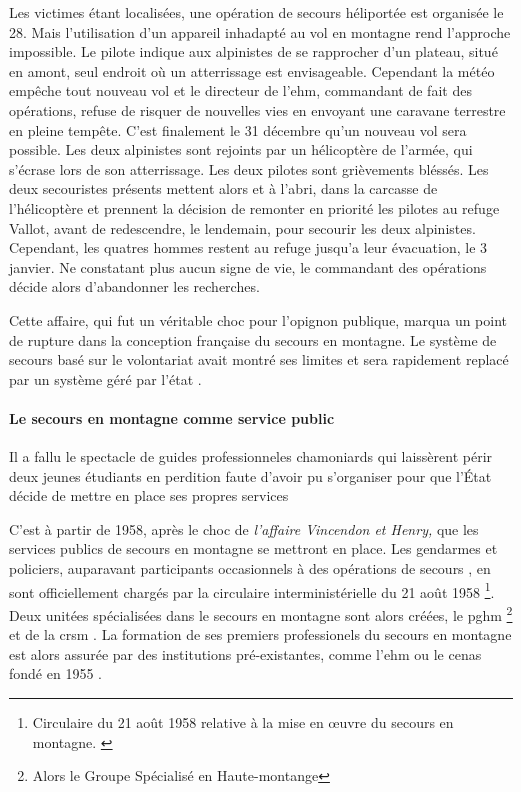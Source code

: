 Les victimes étant localisées, une opération de secours héliportée est
organisée le 28. Mais l'utilisation d'un appareil inhadapté au vol en
montagne rend l'approche impossible. Le pilote indique aux alpinistes
de se rapprocher d'un plateau, situé en amont, seul endroit où un
atterrissage est envisageable. Cependant la météo empêche tout nouveau
vol et le directeur de l'\ac{ehm}, commandant de fait des opérations,
refuse de risquer de nouvelles vies en envoyant une caravane terrestre
en pleine tempête. C'est finalement le 31 décembre qu'un nouveau vol
sera possible. Les deux alpinistes sont rejoints par un hélicoptère de
l'armée, qui s'écrase lors de son atterrissage. Les deux pilotes sont
grièvements bléssés. Les deux secouristes présents mettent alors
 et  à l'abri, dans la carcasse de
l'hélicoptère et prennent la décision de remonter en priorité les
pilotes au refuge Vallot, avant de redescendre, le lendemain, pour
secourir les deux alpinistes. Cependant, les quatres hommes restent au
refuge jusqu'a leur évacuation, le 3 janvier. Ne constatant plus aucun
signe de vie, le commandant des opérations décide alors d'abandonner
les recherches.

Cette affaire, qui fut un véritable choc pour l'opignon publique,
marqua un point de rupture dans la conception française du secours en
montagne. Le système de secours basé sur le volontariat avait montré
ses limites et sera rapidement replacé par un système géré par l'état
\autocite{Ballu1997}.

\paragraph{Le secours en montagne comme service public}
\label{par:1-1-1-1-2}

\begin{displayquote}
  \og Il a fallu le spectacle de guides professionneles chamoniards
  qui laissèrent périr deux jeunes étudiants en perdition faute
  d'avoir pu s'organiser pour que l'État décide de mettre en place ses
  propres services \textelp{}\fg{} \autocite{Descamps2018}
\end{displayquote}

C'est à partir de 1958, après le choc de \emph{l'affaire Vincendon et
  Henry,} que les services publics de secours en montagne se mettront
en place. Les gendarmes et policiers, auparavant participants
occasionnels à des opérations de secours
\autocite{Mollaret2016,CFDLD}, en sont officiellement chargés par la
circulaire interministérielle du 21 août 1958 \footnote{Circulaire  du 21 août 1958 relative à la mise en œuvre du secours en
  montagne. \label{fn:circulaire_21_aout_58}}. Deux unitées
spécialisées dans le secours en montagne sont alors créées, le
\ac{pghm} \footnote{Alors le Groupe Spécialisé en Haute-montange} et
de la \ac{crsm} \autocite{Halle2007}. La formation de ses premiers
professionels du secours en montagne est alors assurée par des
institutions pré-existantes, comme l'\ac{ehm} ou le \ac{cenas} fondé
en 1955 \autocite{Mezin2016}.


